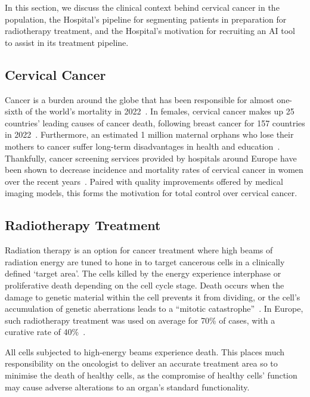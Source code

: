 \documentclass[11pt,twoside]{report}
\begin{document}
In this section, we discuss the clinical context behind cervical cancer in the population, the Hospital's pipeline for segmenting patients in preparation for radiotherapy treatment, and the Hospital's motivation for recruiting an AI tool to assist in its treatment pipeline. 

\subsection{Cervical Cancer}\label{sect:cervical-cancer}

Cancer is a burden around the globe that has been responsible for almost one-sixth of the world's mortality in 2022~\cite{Global-cancer-2022}. In females, cervical cancer makes up 25 countries' leading causes of cancer death, following breast cancer for 157 countries in 2022~\cite{Global-cancer-2022}. Furthermore, an estimated 1 million maternal orphans who lose their mothers to cancer suffer long-term disadvantages in health and education~\cite{Guida2022}. Thankfully, cancer screening services provided by hospitals around Europe have been shown to decrease incidence and mortality rates of cervical cancer in women over the recent years~\cite{Global-cancer-2022}. Paired with quality improvements offered by medical imaging models, this forms the motivation for total control over cervical cancer.

\subsection{Radiotherapy Treatment}

Radiation therapy is an option for cancer treatment where high beams of radiation energy are tuned to hone in to target cancerous cells in a clinically defined `target area'. The cells killed by the energy experience interphase or proliferative death depending on the cell cycle stage. Death occurs when the damage to genetic material within the cell prevents it from dividing, or the cell's accumulation of genetic aberrations leads to a ``mitotic catastrophe''~\cite{cell-death}. In Europe, such radiotherapy treatment was used on average for 70\% of cases, with a curative rate of 40\%~\cite{radiotherapy-advances, Thompson2018}.

All cells subjected to high-energy beams experience death. This places much responsibility on the oncologist to deliver an accurate treatment area so to minimise the death of healthy cells, as the compromise of healthy cells' function may cause adverse alterations to an organ's standard functionality.
\end{document}
